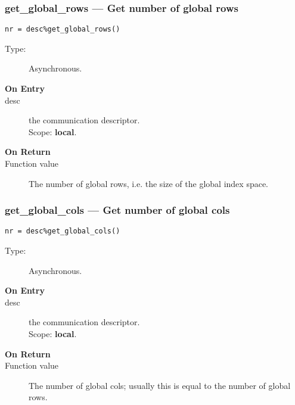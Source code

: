 \subsubsection{get\_global\_rows --- Get number of global rows}

\begin{verbatim}
nr = desc%get_global_rows()
\end{verbatim}

\begin{description}
\item[Type:] Asynchronous.
\item[\bf On Entry]
\item[desc] the communication descriptor.\\
Scope: {\bf local}.\\
\end{description}

\begin{description}
\item[\bf On Return]
\item[Function value] The number of global rows, i.e. the size of the
  global index space. 
\end{description}

\subsubsection{get\_global\_cols --- Get number of global cols}

\begin{verbatim}
nr = desc%get_global_cols()
\end{verbatim}

\begin{description}
\item[Type:] Asynchronous.
\item[\bf On Entry]
\item[desc] the communication descriptor.\\
Scope: {\bf local}.\\
\end{description}

\begin{description}
\item[\bf On Return]
\item[Function value] The number of global cols; usually this is equal
  to the number of global rows. 
\end{description}


